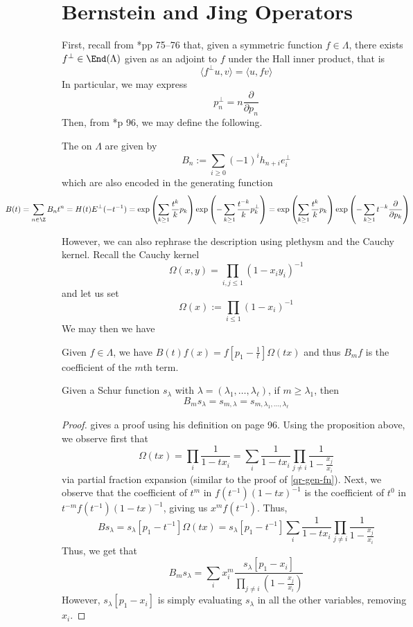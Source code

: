 \documentclass[11pt,leqno,oneside]{amsart}
\numberwithin{thm}{section}
\newcommand{\sym}{\Lambda}
\begin{document}
\section{Bernstein and Jing Operators}
First, recall from \cite{macdonald}*{pp 75--76} that, given a
symmetric function \(f \in \sym\), there exists \(f^\perp
\in \End(\sym)\) given as an adjoint to \(f\) under the Hall inner
product, that is \[
 \langle  f^\perp u, v \rangle = \langle u,fv \rangle
\]
In particular, we may express \[
  p_n^\perp = n \frac{\partial}{\partial p_n}
\]
Then, from \cite{macdonald}*{p 96}, we may define the following.
\begin{defn}
  The  on \(\sym\) are given by \[
    B_n := \sum_{i \geq 0} (-1)^i h_{n+i} e_i^\perp
  \]
  which are also encoded in the
  generating function \[
    \hspace{-1in} B(t) = \sum_{n \in \Z} B_n t^n =
    H(t)E^\perp(-t^{-1}) = \exp\left( \sum_{k \geq 1}
      \frac{t^k}{k} p_k \right) \exp \left( - \sum_{k \geq 1}
      \frac{t^{-k}}{k}
      p_k^\perp \right) = \exp\left( \sum_{k \geq 1}
      \frac{t^k}{k} p_k \right) \exp \left( - \sum_{k \geq 1} t^{-k}
      \frac{\partial}{\partial p_k} \right)
  \]
\end{defn}
However, we can also rephrase the description using plethysm and the
Cauchy kernel. Recall the Cauchy kernel \[
  \Omega(x,y) = \prod_{i,j \leq 1} (1-x_i y_i)^{-1}
\]
and let us set \[
  \Omega(x) := \prod_{i \leq 1} (1-x_i)^{-1}
\]
We may then we have
\begin{prop}
  Given \(f \in \sym\), we have \(B(t) f(x) = f[p_1-\frac{1}{t}]
  \Omega(tx)\) and thus \(B_m f\) is the coefficient of the \(m\)th
  term. 
\end{prop}
\begin{thm}
  Given a Schur function \(s_\lambda\) with \(\lambda = (\lambda_1,
  \ldots, \lambda_\ell)\), if \(m \geq \lambda_1\), then \[
    B_m s_\lambda = s_{m,\lambda} = s_{m,\lambda_1, \ldots,
      \lambda_\ell}
  \] 
\end{thm}
\begin{proof}
  \cite{macdonald} gives a proof using his definition on page
  96. Using the proposition above, we observe first that \[
    \Omega(tx) = \prod_i \frac{1}{1-tx_i} = \sum_i \frac{1}{1-t x_i}
    \prod_{j \neq i} \frac{1}{1-\frac{x_j}{x_i}}
  \]
  via partial fraction expansion (similar to the proof of
  \ref{qr-gen-fn}). Next, we observe that the coefficient of \(t^m\)
  in \(f(t^{-1}) (1-tx)^{-1}\) is the coefficient of \(t^0\) in
  \(t^{-m} f(t^{-1})(1-tx)^{-1}\), giving us \(x^m
  f(t^{-1})\). Thus, \[
    B s_\lambda = s_\lambda[p_1-t^{-1}] \Omega(tx) = s_\lambda [p_1-t^{-1}] \sum_i
    \frac{1}{1-tx_i} \prod_{j \neq i} \frac{1}{1-\frac{x_j}{x_i}}
  \] 
  Thus, we get that \[
    B_m s_\lambda = \sum_i x_i^m \frac{s_\lambda [p_1-x_i]}{\prod_{j
        \neq i}(1-\frac{x_j}{x_i})} 
  \]
  However, \(s_\lambda[p_1-x_i]\) is simply evaluating \(s_\lambda\)
  in all the other variables, removing \(x_i\). 
\end{proof}
\end{document}
